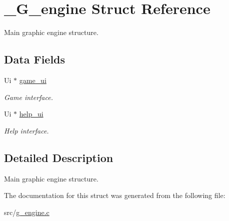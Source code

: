 \hypertarget{struct__G__engine}{}\section{\+\_\+\+G\+\_\+engine Struct Reference}
\label{struct__G__engine}


Main graphic engine structure.  


\subsection*{Data Fields}
\begin{DoxyCompactItemize}
\item 
\mbox{\label{struct__G__engine_a56b776923e2d67db123587e106132365}} 
Ui $\ast$ \hyperlink{struct__G__engine_a56b776923e2d67db123587e106132365}{game\+\_\+ui}
\begin{DoxyCompactList}\small\item\em Game interface. \end{DoxyCompactList}\item 
\mbox{\label{struct__G__engine_a76c426bc9bdd8031c0961abd5530e9c3}} 
Ui $\ast$ \hyperlink{struct__G__engine_a76c426bc9bdd8031c0961abd5530e9c3}{help\+\_\+ui}
\begin{DoxyCompactList}\small\item\em Help interface. \end{DoxyCompactList}\end{DoxyCompactItemize}


\subsection{Detailed Description}
Main graphic engine structure. 

The documentation for this struct was generated from the following file\+:\begin{DoxyCompactItemize}
\item 
src/\hyperlink{g__engine_8c}{g\+\_\+engine.\+c}\end{DoxyCompactItemize}
